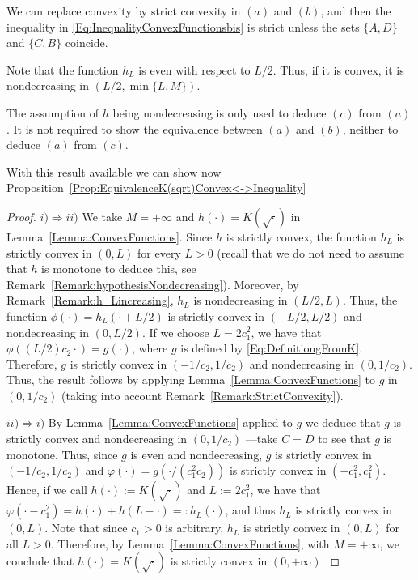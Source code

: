 \begin{remark}
	\label{Remark:StrictConvexity}
	We can replace convexity by strict convexity in $(a)$ and $(b)$, and then the inequality in \eqref{Eq:InequalityConvexFunctionsbis} is strict unless the sets $\{A,D\}$ and $\{C,B\}$ coincide.
\end{remark}

\begin{remark}
	\label{Remark:h_Lincreasing}
	Note that the function $h_L$ is even with respect to $L/2$. Thus, if it is convex, it is nondecreasing in $(L/2, \min \{L,M\})$.
\end{remark}

\begin{remark}
	\label{Remark:hypothesisNondecreasing}
	The assumption of $h$ being nondecreasing is only used to deduce $(c)$ from $(a)$. It is not required to show the equivalence between $(a)$ and $(b)$, neither to deduce $(a)$ from $(c)$.
\end{remark}

With this result available we can show now Proposition~\ref{Prop:EquivalenceK(sqrt)Convex<->Inequality}

\begin{proof}
	$i) \Rightarrow ii)$ We take $M = +\infty$ and $h(\cdot) = K(\sqrt{\cdot})$ in Lemma~\ref{Lemma:ConvexFunctions}. Since $h$ is strictly convex, the function $h_L$ is strictly convex in $(0,L)$ for every $L> 0$ (recall that we do not need to assume that $h$ is monotone to deduce this, see Remark~\ref{Remark:hypothesisNondecreasing}). Moreover, by Remark~\ref{Remark:h_Lincreasing}, $h_L$ is nondecreasing in $(L/2,L)$. Thus, the function $\phi(\cdot) = h_L(\cdot + L/2)$ is strictly convex in $(-L/2,L/2)$ and nondecreasing in $(0,L/2)$. If we choose $L=2c_1^2$, we have that $\phi((L/2)c_2 \cdot) = g(\cdot)$, where $g$ is defined by \eqref{Eq:DefinitiongFromK}. Therefore, $g$ is strictly convex in $(-1/c_2, 1/c_2)$ and nondecreasing in $(0,1/c_2)$. Thus, the result follows by applying  Lemma~\ref{Lemma:ConvexFunctions} to $g$ in $(0,1/c_2)$ (taking into account Remark~\ref{Remark:StrictConvexity}).
	
	
	$ii) \Rightarrow i)$ By Lemma~\ref{Lemma:ConvexFunctions} applied to $g$ we deduce that $g$ is strictly convex and nondecreasing in $(0,1/c_2)$ ---take $C=D$ to see that $g$ is monotone. Thus, since $g$ is even and nondecreasing, $g$ is strictly convex in $(-1/c_2,1/c_2)$ and $\varphi(\cdot) = g(\cdot/(c_1^2 c_2))$ is strictly convex in $(-c_1^2, c_1^2)$. Hence, if we call $h(\cdot) := K(\sqrt{\cdot})$ and $L:= 2c_1^2$, we have that $\varphi(\cdot - c_1^2) = h(\cdot) + h(L-\cdot) =:  h_L(\cdot)$, and thus $h_L$ is strictly convex in $(0,L)$. Note that since $c_1>0$ is arbitrary, $h_L$ is strictly convex in $(0,L)$ for all $L>0$. Therefore, by Lemma~\ref{Lemma:ConvexFunctions}, with  $M = +\infty$, we conclude that $h(\cdot) = K(\sqrt{\cdot})$ is strictly convex in $(0,+\infty)$.
\end{proof}













